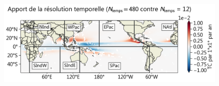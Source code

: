 \documentclass[aspectratio=169, usepdftitle=false, xcolor={dvipsnames}, 9pt,table]{beamer}
\begin{document}
\begin{frame}
\begin{columns}
\begin{column}{0.65\textwidth}
{\begin{figure}
                    \raggedleft
                    \includegraphics[width=\textwidth]{Figures/apport_mensuel.png}
                \end{figure}
            }
            \vspace{-0.8em}
        \end{column}
    \end{columns}
\end{frame}

\end{document}
